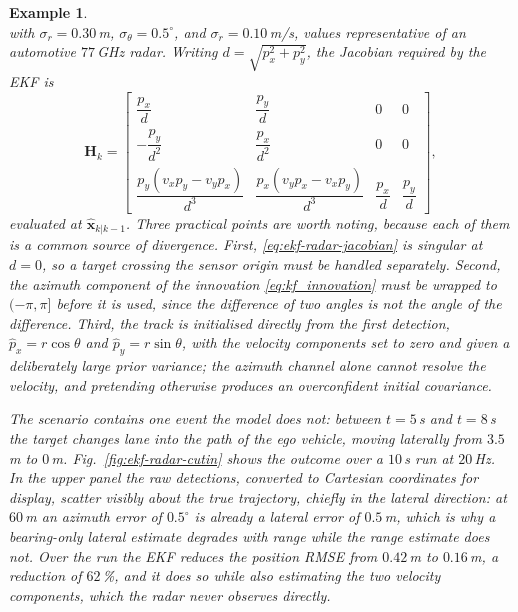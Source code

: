 \documentclass[11pt,oneside,openany]{book}
\newtheorem{example}{Example}[chapter]
\begin{document}
\begin{example}
\begin{equation}
\label{eq:ekf-radar-meas}
\end{equation}
with $\sigma_r=0.30$\,m, $\sigma_\theta=0.5^{\circ}$, and
$\sigma_{\dot r}=0.10$\,m/s, values representative of an automotive
$77$\,GHz radar. Writing $d=\sqrt{p_x^{2}+p_y^{2}}$, the Jacobian required by
the EKF is
\begin{equation}
\mathbf{H}_k=
\begin{bmatrix}
\dfrac{p_x}{d} & \dfrac{p_y}{d} & 0 & 0\\[8pt]
-\dfrac{p_y}{d^{2}} & \dfrac{p_x}{d^{2}} & 0 & 0\\[8pt]
\dfrac{p_y(v_xp_y-v_yp_x)}{d^{3}} &
\dfrac{p_x(v_yp_x-v_xp_y)}{d^{3}} &
\dfrac{p_x}{d} & \dfrac{p_y}{d}
\end{bmatrix},
\label{eq:ekf-radar-jacobian}
\end{equation}
evaluated at $\widehat{\mathbf{x}}_{k|k-1}$. Three practical points are worth
noting, because each of them is a common source of divergence. First,
\eqref{eq:ekf-radar-jacobian} is singular at $d=0$, so a target crossing the
sensor origin must be handled separately. Second, the azimuth component of the
innovation \eqref{eq:kf_innovation} must be wrapped to $(-\pi,\pi]$ before it is
used, since the difference of two angles is not the angle of the difference.
Third, the track is initialised directly from the first detection,
$\widehat{p}_x=r\cos\theta$ and $\widehat{p}_y=r\sin\theta$, with the velocity
components set to zero and given a deliberately large prior variance; the
azimuth channel alone cannot resolve the velocity, and pretending otherwise
produces an overconfident initial covariance.

The scenario contains one event the model does not: between $t=5$\,s and
$t=8$\,s the target changes lane into the path of the ego vehicle, moving
laterally from $3.5$\,m to $0$\,m. Fig.~\ref{fig:ekf-radar-cutin} shows the
outcome over a $10$\,s run at $20$\,Hz. In the upper panel the raw detections,
converted to Cartesian coordinates for display, scatter visibly about the true
trajectory, chiefly in the lateral direction: at $60$\,m an azimuth error of
$0.5^{\circ}$ is already a lateral error of $0.5$\,m, which is why a bearing-only
lateral estimate degrades with range while the range estimate does not. Over the
run the EKF reduces the position RMSE from $0.42$\,m to $0.16$\,m, a reduction of
$62$\,\%, and it does so while also estimating the two velocity components, which
the radar never observes directly.


\end{example}
\end{document}
